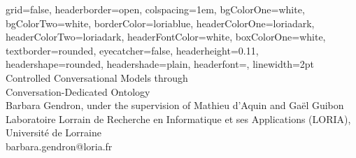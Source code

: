 \documentclass[a0paper,portrait]{baposter}
\begin{document}

\begin{poster}
{
grid=false,
headerborder=open, %
colspacing=1em, %
bgColorOne=white, %
bgColorTwo=white, %
borderColor=loriablue, %
headerColorOne=loriadark, %
headerColorTwo=loriadark, %
headerFontColor=white, %
boxColorOne=white, %
textborder=rounded, %
eyecatcher=false, %
headerheight=0.11\textheight, %
headershape=rounded, %
headershade=plain,
headerfont=\Large\textsf, %
linewidth=2pt %
}
{}
%
%
{\textsf{Controlled Conversational Models through \\ Conversation-Dedicated Ontology}}
{\sf\vspace{0.3em}\\
Barbara Gendron, under the supervision of Mathieu d'Aquin and Gaël Guibon
\vspace{0.1em}\\
\small{Laboratoire Lorrain de Recherche en Informatique et ses Applications (LORIA), Université de Lorraine
\vspace{0.2em}\\
barbara.gendron@loria.fr
}}
{
}%


\end{poster}
\end{document}
